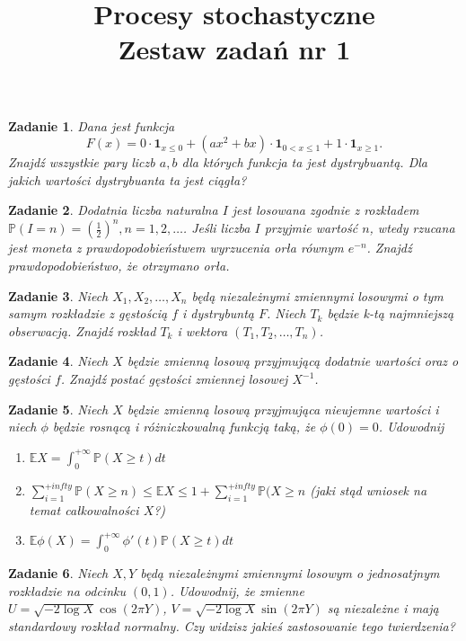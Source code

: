 \documentclass{mwart}
\title{Procesy stochastyczne\\ Zestaw zadań nr 1}
\newtheorem{zd}{Zadanie}
\begin{document}

\maketitle
\begin{zd}
Dana jest funkcja
\begin{displaymath}
F(x) = 0\cdot\pmb{1}_{x\leq 0} + (ax^2+bx)\cdot\pmb{1}_{0<x\leq 1} + 1\cdot \pmb{1}_{x\geq 1}.
\end{displaymath}
Znajdź wszystkie pary liczb $a, b$ dla których funkcja ta jest dystrybuantą. Dla jakich wartości dystrybuanta ta jest ciągła?
\end{zd}

\begin{zd}
Dodatnia liczba naturalna $I$ jest losowana zgodnie z rozkładem $\mathbb{P}(I =n) = \left(\frac{1}{2}\right)^n, n = 1,2, \dots$. Jeśli liczba $I$ przyjmie wartość $n$, wtedy rzucana jest moneta z prawdopodobieństwem wyrzucenia orła równym $e^{-n}$. Znajdź prawdopodobieństwo, że otrzymano orła.
\end{zd}

\begin{zd}
Niech $X_1, X_2, \dots, X_n$ będą niezależnymi zmiennymi losowymi o tym samym rozkładzie z gęstością $f$ i dystrybuntą $F$. Niech $T_k$ będzie k-tą najmniejszą obserwacją. Znajdź rozkład $T_k$ i wektora $(T_1, T_2, \dots, T_n)$.
\end{zd}

\begin{zd}
Niech $X$ będzie zmienną losową przyjmującą dodatnie wartości oraz o gęstości $f$. Znajdź postać gęstości zmiennej losowej $X^{-1}$.
\end{zd}
\begin{zd}
Niech $X$ będzie zmienną losową przyjmująca nieujemne wartości i niech $\phi$ będzie rosnącą i różniczkowalną funkcją taką, że $\phi(0) =0$. Udowodnij
\begin{enumerate}
\item $\mathbb{E}X = \int_0^{+\infty}\mathbb{P}(X\geq t)dt$
\item $\sum_{i=1}^{+infty}\mathbb{P}(X \geq n) \leq \mathbb{E}X \leq 1 +\sum_{i=1}^{+infty}\mathbb{P}(X \geq n$ (jaki stąd wniosek na temat całkowalności $X$?)
\item  $\mathbb{E}\phi(X) = \int_0^{+\infty}\phi'(t)\mathbb{P}(X\geq t)dt$
\end{enumerate}
\end{zd}

\begin{zd}
Niech $X, Y$ będą niezależnymi zmiennymi losowym o jednosatjnym rozkładzie na odcinku $(0,1)$. Udowodnij, że zmienne $U = \sqrt{-2\log X}\cos(2\pi Y)$, $V = \sqrt{-2\log X}\sin (2\pi Y)$ są niezależne i mają standardowy rozkład normalny. Czy widzisz jakieś zastosowanie tego twierdzenia?
\end{zd}
\end{document}
